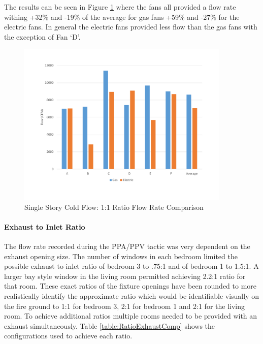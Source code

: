 \documentclass{article}
\begin{document}
The results can be seen in Figure \ref{fig:1_1RatioSingleStory} where the fans all provided a flow rate withing +32\% and -19\% of the average for gas fans +59\% and -27\% for the electric fans. In general the electric fans provided less flow than the gas fans with the exception of Fan `D'. 

\begin{figure}[H]
	\centering
	\includegraphics[width=4in]{0_Images/ColdFlow/Single_Story/1_1_Ratio.pdf}
	\caption{Single Story Cold Flow: 1:1 Ratio Flow Rate Comparison}
	\label{fig:1_1RatioSingleStory}
\end{figure}

\paragraph{Exhaust to Inlet Ratio} \mbox{}

The flow rate recorded during the PPA/PPV tactic was very dependent on the exhaust opening size. The number of windows in each bedroom limited the possible exhaust to inlet ratio of bedroom 3 to .75:1 and of bedroom 1 to 1.5:1.  A larger bay style window in the living room permitted achieving 2.2:1 ratio for that room. These exact ratios of the fixture openings have been rounded to more realistically identify the approximate ratio which would be identifiable visually on the fire ground to 1:1 for bedroom 3, 2:1 for bedroom 1 and 2:1 for the living room. To achieve additional ratios multiple rooms needed to be provided with an exhaust simultaneously. Table \ref{table:RatioExhaustComp} shows the configurations used to achieve each ratio.
\end{document}
